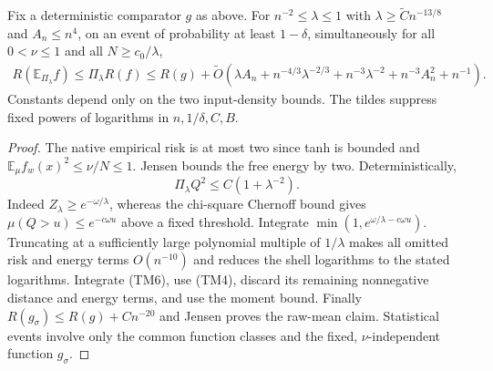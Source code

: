 \begin{theorem}
\label{thm:tanh-midpoint-oracle}
Fix a deterministic comparator $g$ as above. For
$n^{-2}\le\lambda\le1$ with $\lambda\ge\widetilde Cn^{-13/8}$
and $A_n\le n^4$, on an event of probability at least $1-\delta$,
simultaneously for all $0<\nu\le1$ and all $N\ge c_0/\lambda$,
\begin{align}
 R(\mathbb E_{\Pi_\lambda}f)\le\Pi_\lambda R(f)
 \le R(g)+\widetilde O\left(
 \lambda A_n+n^{-4/3}\lambda^{-2/3}
 +n^{-3}\lambda^{-2}+n^{-3}A_n^2+n^{-1}\right).           \tag{TM7}
\end{align}
Constants depend only on the two input-density bounds. The tildes
suppress fixed powers of logarithms in $n,1/\delta,C,B$.
\end{theorem}
\begin{proof}
The native empirical risk is at most two since tanh is bounded and
$\mathbb E_\mu f_w(x)^2\le\nu/N\le1$. Jensen bounds the free energy
by two. Deterministically,
\[
 \Pi_\lambda Q^2\le C(1+\lambda^{-2}).
\]
Indeed $Z_\lambda\ge e^{-\omega/\lambda}$, whereas the chi-square
Chernoff bound gives $\mu(Q>u)\le e^{-c\omega u}$ above a fixed
threshold. Integrate
$\min(1,e^{\omega/\lambda-c\omega u})$.
Truncating at a sufficiently large polynomial multiple of $1/\lambda$
makes all omitted risk and energy terms $O(n^{-10})$ and reduces the
shell logarithms to the stated logarithms. Integrate (TM6), use (TM4),
discard its remaining nonnegative distance and energy terms, and use
the moment bound. Finally $R(g_\sigma)\le R(g)+Cn^{-20}$ and Jensen
proves the raw-mean claim. Statistical events involve only the common
function classes and the fixed, $\nu$-independent function $g_\sigma$.
\end{proof}

